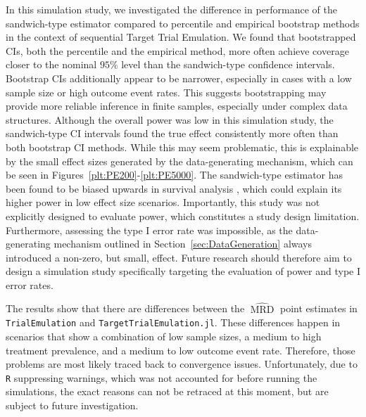 \documentclass[pdflatex,sn-vancouver-ay]{sn-jnl}%
\theoremstyle{thmstyleone}%
\theoremstyle{thmstyletwo}%
\theoremstyle{thmstylethree}%
\newcommand{\Rlang}{\texttt{R}}
\newcommand{\RTTE}{\texttt{TrialEmulation}}
\newcommand{\juliaTTE}{\texttt{TargetTrialEmulation.jl}}
\begin{document}
In this simulation study, we investigated the difference in performance of the sandwich-type estimator compared to percentile and empirical bootstrap methods in the context of sequential Target Trial Emulation. We found that bootstrapped CIs, both the percentile and the empirical method, more often achieve coverage closer to the nominal $95\%$ level than the sandwich-type confidence intervals. Bootstrap CIs additionally appear to be narrower, especially in cases with a low sample size or high outcome event rates. This suggests bootstrapping may provide more reliable inference in finite samples, especially under complex data structures. Although the overall power was low in this simulation study, the sandwich-type CI intervals found the true effect consistently more often than both bootstrap CI methods. While this may seem problematic, this is explainable by the small effect sizes generated by the data-generating mechanism, which can be seen in Figures~\ref{plt:PE200}-\ref{plt:PE5000}. The sandwich-type estimator has been found to be biased upwards in survival analysis \citep{austinVarianceEstimationWhen2016}, which could explain its higher power in low effect size scenarios. Importantly, this study was not explicitly designed to evaluate power, which constitutes a study design limitation. Furthermore, assessing the type I error rate was impossible, as the data-generating mechanism outlined in Section~\ref{sec:DataGeneration} always introduced a non-zero, but small, effect. Future research should therefore aim to design a simulation study specifically targeting the evaluation of power and type I error rates. 

The results show that there are differences between the $\widehat{\operatorname{MRD}}$ point estimates in \RTTE{} and \juliaTTE{}. These differences happen in scenarios that show a combination of low sample sizes, a medium to high treatment prevalence, and a medium to low outcome event rate. Therefore, those problems are most likely traced back to convergence issues. Unfortunately, due to \Rlang{} suppressing warnings, which was not accounted for before running the simulations, the exact reasons can not be retraced at this moment, but are subject to future investigation.
\end{document}
